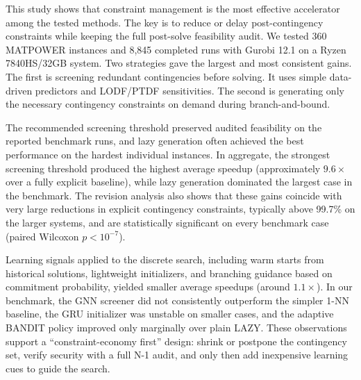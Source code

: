 \documentclass[runningheads]{llncs}
\begin{document}
This study shows that constraint management is the most effective accelerator among the tested methods. The key is to reduce or delay post-contingency constraints while keeping the full post-solve feasibility audit. We tested 360 MATPOWER instances and 8,845 completed runs with Gurobi 12.1 on a Ryzen 7840HS/32GB system. Two strategies gave the largest and most consistent gains. The first is screening redundant contingencies before solving. It uses simple data-driven predictors and LODF/PTDF sensitivities. The second is generating only the necessary contingency constraints on demand during branch-and-bound.

The recommended screening threshold preserved audited feasibility on the reported benchmark runs, and lazy generation often achieved the best performance on the hardest individual instances. In aggregate, the strongest screening threshold produced the highest average speedup (approximately $9.6\times$ over a fully explicit baseline), while lazy generation dominated the largest case in the benchmark. The revision analysis also shows that these gains coincide with very large reductions in explicit contingency constraints, typically above 99.7\% on the larger systems, and are statistically significant on every benchmark case (paired Wilcoxon $p<10^{-7}$).

Learning signals applied to the discrete search, including warm starts from historical solutions, lightweight initializers, and branching guidance based on commitment probability, yielded smaller average speedups (around $1.1\times$). In our benchmark, the GNN screener did not consistently outperform the simpler 1-NN baseline, the GRU initializer was unstable on smaller cases, and the adaptive BANDIT policy improved only marginally over plain LAZY. These observations support a ``constraint-economy first'' design: shrink or postpone the contingency set, verify security with a full N-1 audit, and only then add inexpensive learning cues to guide the search.
\end{document}
